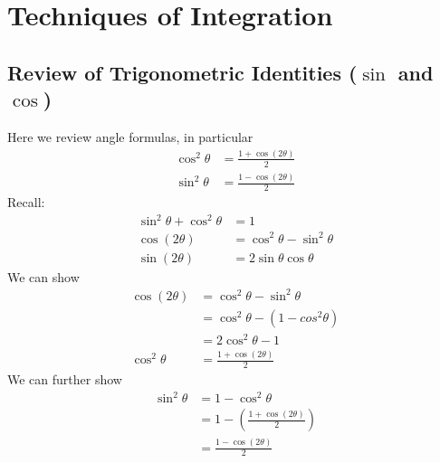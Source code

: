 \documentclass{report}
\begin{document}

\section{Techniques of Integration}

\subsection{Review of Trigonometric Identities ($\sin$ and $\cos$)} %
Here we review angle formulas, in particular
\begin{align*}
\cos^2\theta&=\frac{1+\cos(2\theta)}{2}\\
\sin^2\theta&=\frac{1-\cos(2\theta)}{2}
\end{align*}
Recall:
\begin{align*}
\sin^2\theta+\cos^2\theta&=1\\
\cos(2\theta)&=\cos^2\theta-\sin^2\theta\\
\sin(2\theta)&=2\sin\theta\cos\theta
\end{align*}
We can show
\begin{align*}
\cos(2\theta)&=\cos^2\theta-\sin^2\theta\\
&=\cos^2\theta-(1-cos^2\theta)\\
&=2\cos^2\theta-1\\
\cos^2\theta&=\frac{1+\cos(2\theta)}{2}
\end{align*}
We can further show
\begin{align*}
\sin^2\theta&=1-\cos^2\theta\\
&=1-\left(\frac{1+\cos(2\theta)}{2}\right)\\
&=\frac{1-\cos(2\theta)}{2}
\end{align*}
\newpage
\end{document}
